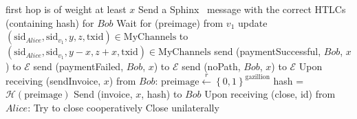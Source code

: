 \begin{algorithmic}[1]
{      first hop is of weight at least $x$}
        \State Send a Sphinx~\cite{sphinx} message with the correct HTLCs (containing
        hash) for $Bob$
        \State {}
        \State Wait for (preimage) from $v_1$
          \State update $\left(\mathrm{sid}_{Alice}, \mathrm{sid}_{v_1}, y, z,
          \mathrm{txid}\right) \in \mathrm{MyChannels}$ to $\left(\mathrm{sid}_{Alice},
          \mathrm{sid}_{v_1}, y - x, z + x, \mathrm{txid}\right) \in \mathrm{MyChannels}$
          \State send (paymentSuccessful, $Bob$, $x$) to $\mathcal{E}$
        \Else
          \State send (paymentFailed, $Bob$, $x$) to $\mathcal{E}$
        \EndIf
      \Else
        \State send (noPath, $Bob$, $x$) to $\mathcal{E}$
      \EndIf
    \State
    \State Upon receiving (sendInvoice, $x$) from $Bob$:
      \State $\mathrm{preimage} \overset{r}{\leftarrow}
      \left\{0,1\right\}^{\mathrm{gazillion}}$
      \State hash = $\mathcal{H}\left(\mathrm{preimage}\right)$
      \State Send (invoice, $x$, hash) to $Bob$
    \State
    \State Upon receiving (close, id) from $Alice$:
        \State Try to close cooperatively 
         
          \State Close unilaterally 
        \EndIf
      \EndIf
  \end{algorithmic}
\hrulefill
